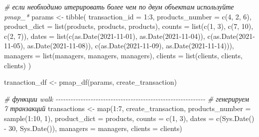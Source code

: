\documentclass[
]{book}
\newenvironment{Shaded}{\begin{snugshade}}{\end{snugshade}}
\newcommand{\AttributeTok}[1]{\textcolor[rgb]{0.77,0.63,0.00}{#1}}
\newcommand{\CommentTok}[1]{\textcolor[rgb]{0.56,0.35,0.01}{\textit{#1}}}
\newcommand{\DecValTok}[1]{\textcolor[rgb]{0.00,0.00,0.81}{#1}}
\newcommand{\FunctionTok}[1]{\textcolor[rgb]{0.00,0.00,0.00}{#1}}
\newcommand{\NormalTok}[1]{#1}
\newcommand{\OtherTok}[1]{\textcolor[rgb]{0.56,0.35,0.01}{#1}}
\newcommand{\SpecialCharTok}[1]{\textcolor[rgb]{0.00,0.00,0.00}{#1}}
\newcommand{\StringTok}[1]{\textcolor[rgb]{0.31,0.60,0.02}{#1}}
\begin{document}
\begin{Shaded}
\begin{Highlighting}[]
\CommentTok{\# если необходимо итерировать более чем по двум объектам используйте pmap\_*}
\NormalTok{params }\OtherTok{\textless{}{-}} \FunctionTok{tibble}\NormalTok{(}
  \AttributeTok{transaction\_id  =} \DecValTok{1}\SpecialCharTok{:}\DecValTok{3}\NormalTok{,}
  \AttributeTok{products\_number =} \FunctionTok{c}\NormalTok{(}\DecValTok{4}\NormalTok{, }\DecValTok{2}\NormalTok{, }\DecValTok{6}\NormalTok{),}
  \AttributeTok{product\_dict    =} \FunctionTok{list}\NormalTok{(products, products, products),}
  \AttributeTok{counts          =} \FunctionTok{list}\NormalTok{(}\FunctionTok{c}\NormalTok{(}\DecValTok{1}\NormalTok{, }\DecValTok{3}\NormalTok{), }\FunctionTok{c}\NormalTok{(}\DecValTok{7}\NormalTok{, }\DecValTok{10}\NormalTok{), }\FunctionTok{c}\NormalTok{(}\DecValTok{2}\NormalTok{, }\DecValTok{7}\NormalTok{)),}
  \AttributeTok{dates           =} \FunctionTok{list}\NormalTok{(}\FunctionTok{c}\NormalTok{(}\FunctionTok{as.Date}\NormalTok{(}\StringTok{\textquotesingle{}2021{-}11{-}01\textquotesingle{}}\NormalTok{), }\FunctionTok{as.Date}\NormalTok{(}\StringTok{\textquotesingle{}2021{-}11{-}04\textquotesingle{}}\NormalTok{)),}
                         \FunctionTok{c}\NormalTok{(}\FunctionTok{as.Date}\NormalTok{(}\StringTok{\textquotesingle{}2021{-}11{-}05\textquotesingle{}}\NormalTok{), }\FunctionTok{as.Date}\NormalTok{(}\StringTok{\textquotesingle{}2021{-}11{-}08\textquotesingle{}}\NormalTok{)),}
                         \FunctionTok{c}\NormalTok{(}\FunctionTok{as.Date}\NormalTok{(}\StringTok{\textquotesingle{}2021{-}11{-}09\textquotesingle{}}\NormalTok{), }\FunctionTok{as.Date}\NormalTok{(}\StringTok{\textquotesingle{}2021{-}11{-}14\textquotesingle{}}\NormalTok{))),}
  \AttributeTok{managers        =} \FunctionTok{list}\NormalTok{(managers, managers, managers),}
  \AttributeTok{clients         =} \FunctionTok{list}\NormalTok{(clients, clients, clients)}
\NormalTok{)}

\NormalTok{tranaction\_df }\OtherTok{\textless{}{-}} \FunctionTok{pmap\_df}\NormalTok{(params, create\_transaction)}

\CommentTok{\# функции walk {-}{-}{-}{-}{-}{-}{-}{-}{-}{-}{-}{-}{-}{-}{-}{-}{-}{-}{-}{-}{-}{-}{-}{-}{-}{-}{-}{-}{-}{-}{-}{-}{-}{-}{-}{-}{-}{-}{-}{-}{-}{-}{-}{-}{-}{-}{-}{-}{-}{-}{-}{-}{-}{-}{-}{-}{-}{-}{-}{-}}
\CommentTok{\# генерируем 7 транзакций}
\NormalTok{transactions }\OtherTok{\textless{}{-}} \FunctionTok{map}\NormalTok{(}\DecValTok{1}\SpecialCharTok{:}\DecValTok{7}\NormalTok{,}
\NormalTok{                    create\_transaction,}
                    \AttributeTok{products\_number =} \FunctionTok{sample}\NormalTok{(}\DecValTok{1}\SpecialCharTok{:}\DecValTok{10}\NormalTok{, }\DecValTok{1}\NormalTok{),}
                    \AttributeTok{product\_dict =}\NormalTok{ products,}
                    \AttributeTok{counts =} \FunctionTok{c}\NormalTok{(}\DecValTok{1}\NormalTok{, }\DecValTok{3}\NormalTok{),}
                    \AttributeTok{dates =} \FunctionTok{c}\NormalTok{(}\FunctionTok{Sys.Date}\NormalTok{() }\SpecialCharTok{{-}} \DecValTok{30}\NormalTok{, }\FunctionTok{Sys.Date}\NormalTok{()),}
                    \AttributeTok{managers =}\NormalTok{ managers,}
                    \AttributeTok{clients =}\NormalTok{ clients)}


\end{Highlighting}
\end{Shaded}
\end{document}
